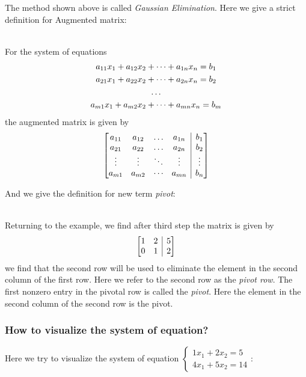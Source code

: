 \enlargethispage{1cm}
The method shown above is called \emph{Gaussian Elimination}.
Here we give a strict definition for Augmented matrix:

\pagebreak[3]



\begin{definition}
\qquad \\
For the system of equations
\begin{gather}
a_{11}x_1 + a_{12}x_2 + \dots + a_{1n}x_n = b_1 \notag \\ 
a_{21}x_1 + a_{22}x_2 + \dots + a_{2n}x_n = b_2 \notag \\
\dots 	\notag 	\\
a_{m1}x_1 + a_{m2}x_2 + \dots + a_{mn}x_n = b_m  \label{eq:linear system equations_2}
\end{gather}
the augmented matrix is given by 
\[\left[
\begin{array}{@{}cccc|c@{}}
a_{11} & a_{12} & \dots & a_{1n} &  b_1 \\
a_{21} & a_{22} & \dots & a_{2n} &  b_2 \\
\vdots    & \vdots    & \ddots & \vdots    & \vdots \\
a_{m1} & a_{m2} & \cdots & a_{mn} &   b_n
\end{array}
\right]\]

\end{definition}

And we give the definition for new term \emph{pivot}:
\begin{definition}[pivot] \qquad \\
Returning to the example, we find after third step the matrix is given by 
\[
\left[
\begin{array}{@{}cc|c@{}}
1 & 2 & 5 \\
0 & 1 & 2
\end{array}
\right]
\]
we find that the second row will be used to eliminate the element
in the second column of the first row. Here we refer to the second row as the \emph{pivot
row}. The first nonzero entry in the pivotal row is called the \emph{pivot}. Here the element in the second column of the second row is the pivot.
\end{definition}

\subsubsection{How to visualize the system of equation?}
Here we try to visualize the system of equation $
\left \{	\begin{gathered}
1x_1 + 2x_2 =5	\\
4x_1 + 5x_2 = 14 
\end{gathered}	\right.$:



